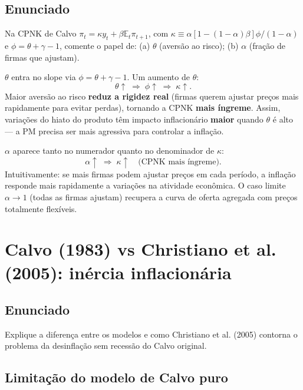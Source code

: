 \documentclass[12pt, a4paper]{article}
\newcommand{\E}{\mathbb{E}}
\begin{document}
\subsection*{Enunciado}
Na CPNK de Calvo $\pi_t = \kappa y_t + \beta\E_t\pi_{t+1}$, com
$\kappa \equiv \alpha[1-(1-\alpha)\beta]\phi/(1-\alpha)$ e $\phi = \theta + \gamma - 1$,
comente o papel de: (a) $\theta$ (aversão ao risco); (b) $\alpha$ (fração de firmas
que ajustam).

\begin{resultbox}[title={(a) Papel de $\theta$ — aversão ao risco}]
$\theta$ entra no slope via $\phi = \theta + \gamma - 1$. Um aumento de $\theta$:
\[
\theta \uparrow \;\Rightarrow\; \phi \uparrow \;\Rightarrow\; \kappa \uparrow.
\]
Maior aversão ao risco \textbf{reduz a rigidez real} (firmas querem ajustar preços
mais rapidamente para evitar perdas), tornando a CPNK \textbf{mais íngreme}.
Assim, variações do hiato do produto têm impacto inflacionário \textbf{maior} quando
$\theta$ é alto --- a PM precisa ser mais agressiva para controlar a inflação.
\end{resultbox}

\begin{resultbox}[title={(b) Papel de $\alpha$ — fração de firmas que ajustam}]
$\alpha$ aparece tanto no numerador quanto no denominador de $\kappa$:
\[
\alpha \uparrow \;\Rightarrow\; \kappa \uparrow \quad \text{(CPNK mais íngreme)}.
\]
Intuitivamente: se mais firmas podem ajustar preços em cada período, a inflação
responde mais rapidamente a variações na atividade econômica.
O caso limite $\alpha \to 1$ (todas as firmas ajustam) recupera a curva de oferta
agregada com preços totalmente flexíveis.
\end{resultbox}

\section{Calvo (1983) vs Christiano et al. (2005): inércia inflacionária}

\subsection*{Enunciado}
Explique a diferença entre os modelos e como Christiano et al. (2005) contorna o
problema da desinflação sem recessão do Calvo original.

\subsection*{Limitação do modelo de Calvo puro}
\end{document}
